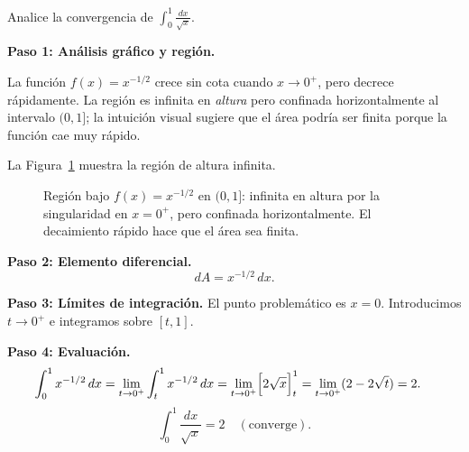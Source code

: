 \begin{example}
Analice la convergencia de $\displaystyle\int_{0}^{1}\frac{dx}{\sqrt{x}}$.
\begin{myproof}
\textbf{Paso 1: Análisis gráfico y región.}

La función $f(x)=x^{-1/2}$ crece sin cota cuando $x\to 0^+$, pero decrece rápidamente. La región
es infinita en \emph{altura} pero confinada horizontalmente al intervalo $(0,1]$; la intuición
visual sugiere que el área podría ser finita porque la función cae muy rápido.

La Figura~\ref{fig:impropia_singularidad_raiz} muestra la región de altura infinita.

\begin{figure}[H]
\centering
{}
\caption{Región bajo $f(x)=x^{-1/2}$ en $(0,1]$: infinita en altura por la singularidad en $x=0^+$, pero confinada horizontalmente. El decaimiento rápido hace que el área sea finita.}
\label{fig:impropia_singularidad_raiz}
\end{figure}

\textbf{Paso 2: Elemento diferencial.}
\[
  dA = x^{-1/2}\,dx.
\]

\textbf{Paso 3: Límites de integración.}
El punto problemático es $x=0$. Introducimos $t\to 0^+$ e integramos sobre $[t,1]$.

\textbf{Paso 4: Evaluación.}
\begin{align*}
\int_0^1 x^{-1/2}\,dx
  &= \lim_{t\to 0^+}\int_t^1 x^{-1/2}\,dx
   = \lim_{t\to 0^+}\Bigl[2\sqrt{x}\Bigr]_t^1
   = \lim_{t\to 0^+}(2-2\sqrt{t}) = 2.
\end{align*}
\[
  \boxed{\int_0^1\frac{dx}{\sqrt{x}} = 2 \quad (\text{converge}).}
\]
\end{myproof}
\end{example}

